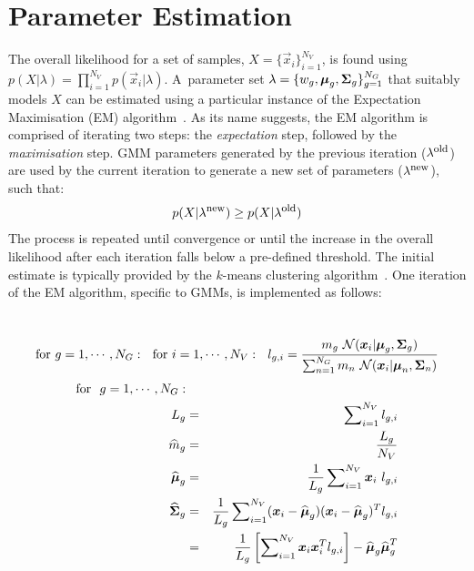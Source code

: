 \section{Parameter Estimation}


\noindent
The overall likelihood for a set of samples, $X=\{\Vec{x}_i\}_{i=1}^{N_V}$,
is found using $p(X | \lambda) = \prod\nolimits_{i=1}^{N_V} p(\Vec{x}_i | \lambda)$.
A~parameter set $\lambda = \{ w_g, {\boldsymbol{\mu}}_g, {\boldsymbol{\Sigma}}_g \}_{g=1}^{N_G}$
that suitably models $X$ can be estimated using a particular instance of the Expectation Maximisation (EM) algorithm~\cite{Dempster77, McLachlan-2008, Moon96, Redner84}.
As its name suggests, the EM algorithm is comprised of iterating two steps: the {\it expectation} step, followed by the {\it maximisation} step.
GMM parameters generated by the previous iteration ($\lambda^{\mbox{\footnotesize old}}$) are used
by the current iteration to generate a new set of parameters ($\lambda^{\mbox{\footnotesize new}}$), such that:
%
\begin{eqnarray}
	p(X|\lambda^{\mbox{\footnotesize new}}) \geq p(X|\lambda^{\mbox{\footnotesize old}})
\end{eqnarray}
%
The process is repeated until convergence or until the increase in the overall likelihood after each iteration falls below a pre-defined threshold.
The initial estimate is typically provided by the $k$-means clustering algorithm~\cite{Duda01}.
One iteration of the EM algorithm, specific to GMMs, is implemented as follows:

~ \\

\begin{eqnarray}
%
\mbox{for} ~ g=1, \cdots,N_G: ~~ \mbox{for} ~i=1, \cdots, N_V:  ~~ l_{g,i} = \frac{m_g ~ {{\mathcal{N}}}( \Vec{x}_i | \Vec{\mu}_g, \Mat{\Sigma}_g )}
														{\sum\nolimits_{n=1}^{N_G} m_n ~ {{\mathcal{N}}}( \Vec{x}_i | \Vec{\mu}_n, \Mat{\Sigma}_n )}
%
\end{eqnarray}
%
\begin{eqnarray}
%
\mbox{for} ~~ g  =  1, \cdots, N_G:  \nonumber \\
	L_g & = & \sum\nolimits_{i=1}^{N_V} l_{g,i} \label{eqn:L_k} \\
	\widehat{m}_g & = & \frac{L_g}{N_V} \label{eqn:m_k} \\
	\widehat{\Vec{\mu}}_g & = & \frac{1}{L_g} \sum\nolimits_{i=1}^{N_V} \Vec{x}_i ~ l_{g,i}  \label{eqn:em_mean} \\
	\widehat{\Mat{\Sigma}}_g & = & \frac{1}{L_g} \sum\nolimits_{i=1}^{N_V} (\Vec{x}_i - \widehat{\Vec{\mu}}_g)(\Vec{x}_i - \widehat{\Vec{\mu}}_g)^T l_{g,i} \label{eqn:em_covA} \\
	& = &  \frac{1}{L_g} \left[ \sum\nolimits_{i=1}^{N_V} \Vec{x}_i \Vec{x}_i^T l_{g,i} \right] - \widehat{\Vec{\mu}}_g \widehat{\Vec{\mu}}_g^T \label{eqn:em_covB} \\
\end{eqnarray}

